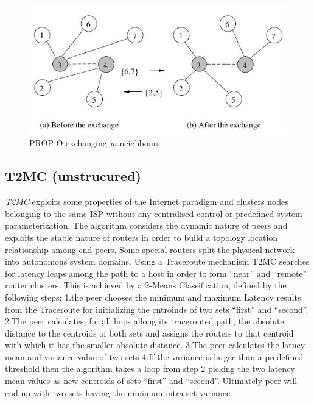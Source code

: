 \documentclass[a4paper,10pt]{article}
\begin{document}
\begin{figure}
\centering
  \includegraphics[scale=0.4]{img/prop-o.jpeg}
\caption{PROP-O exchanging \emph{m} neighbours.}
\label{figure:prop-o}
\end{figure}

\subsection{T2MC (unstrucured)}
\emph{T2MC}\cite{shi_t2mc_2008} exploits some properties of the Internet paradigm and clusters nodes belonging to the same ISP without any centralised control or predefined system parameterization. The algorithm considers the dynamic nature of peers and exploits the stable nature of routers in order to build a topology location relationship among end peers.
Some special routers split the physical network into autonomous system domains. Using a Traceroute mechanism T2MC searches for latency leaps among the path to a host in order to form ``near'' and ``remote'' router clusters. This is achieved by a 2-Means Classification, defined by the following steps:
1.the peer chooses the minimum and maximum Latency results from the Traceroute for initializing the cntroinds of two sets ``first'' and ``second''.
2.The peer calculates, for all hops allong its tracerouted path, the absolute distance to the centroids of both sets and assigns the routers to that centroid with which it has the smaller absolute distance.
3.The peer calculates the latncy mean and variance value of two sets
4.If the variance is larger than a predefined threshold then the algorithm takes a loop from step 2 picking the two latency mean values as new centroids of sets ``first'' and ``second''. Ultimately peer will end up with two sets having the minimum intra-set variance.
\end{document}
